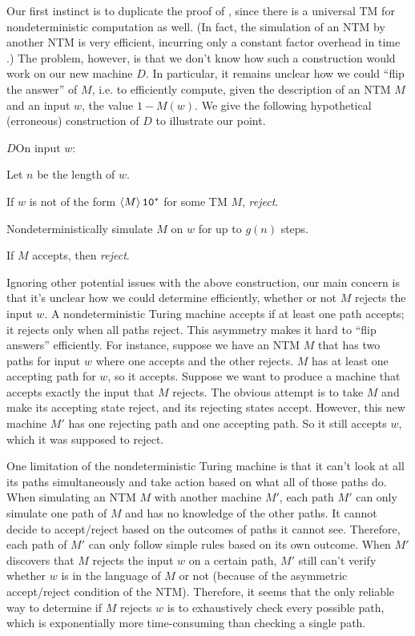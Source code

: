 \documentclass[11pt,twoside=off,numbers=noenddot]{scrbook}
\begin{document}
Our first instinct is to duplicate the proof of , since there is a universal TM for nondeterministic computation as well. (In fact, the simulation of an NTM by another NTM is very efficient, incurring only a constant factor overhead in time \cite{arora2009computational}.) The problem, however, is that we don't know how such a construction would work on our new machine $D$. In particular, it remains unclear how we could ``flip the answer'' of $M$, i.e. to efficiently compute, given the description of an NTM $M$ and an input $w$, the value $1 - M(w)$. We give the following hypothetical (erroneous) construction of $D$ to illustrate our point.

\begin{turing}{$D$}{On input $w$:}
\item Let $n$ be the length of $w$.
\item If $w$ is not of the form $\left< M \right>\texttt{1}\texttt{0}^\ast$ for some TM $M$, \emph{reject}.
\item Nondeterministically simulate $M$ on $w$ for up to $g(n)$ steps.
\item If $M$ accepts, then \emph{reject}. 
\end{turing}

Ignoring other potential issues with the above construction, our main concern is that it's unclear how we could determine efficiently, whether or not $M$ rejects the input $w$. A nondeterministic Turing machine accepts if at least one path accepts; it rejects only when all paths reject. This asymmetry makes it hard to ``flip answers'' efficiently. For instance, suppose we have an NTM $M$ that has two paths for input $w$ where one accepts and the other rejects. $M$ has at least one accepting path for $w$, so it accepts. Suppose we want to produce a machine that accepts exactly the input that $M$ rejects. The obvious attempt is to take $M$ and make its accepting state reject, and its rejecting states accept. However, this new machine $M'$ has one rejecting path and one accepting path. So it still accepts $w$, which it was supposed to reject.

One limitation of the nondeterministic Turing machine is that it can't look at all its paths simultaneously and take action based on what all of those paths do. When simulating an NTM $M$ with another machine $M'$, each path $M'$ can only simulate one path of $M$ and has no knowledge of the other paths. It cannot decide to accept/reject based on the outcomes of paths it cannot see. Therefore, each path of $M'$ can only follow simple rules based on its own outcome. When $M'$ discovers that $M$ rejects the input $w$ on a certain path, $M'$ still can't verify whether $w$ is in the language of $M$ or not (because of the asymmetric accept/reject condition of the NTM). Therefore, it seems that the only reliable way to determine if $M$ rejects $w$ is to exhaustively check every possible path, which is exponentially more time-consuming than checking a single path.
\end{document}
